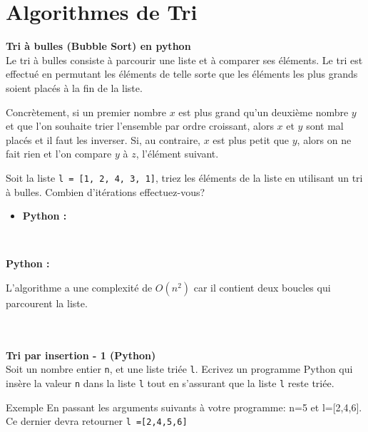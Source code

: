 \section{Algorithmes de Tri}

\begin{Exercice} [20 minutes] \textbf{Tri à bulles (Bubble Sort) en python} \\
Le tri à bulles consiste à parcourir une liste et à comparer ses éléments. Le tri est effectué en permutant les éléments de telle sorte que les éléments les plus grands soient placés à la fin de la liste. 

Concrètement, si un premier nombre $x$ est plus grand qu'un deuxième nombre $y$ et que l'on souhaite trier l'ensemble par ordre croissant, alors $x$ et $y$ sont mal placés et il faut les inverser. Si, au contraire, $x$ est plus petit que $y$, alors on ne fait rien et l'on compare $y$ à $z$, l'élément suivant.

Soit la liste \lstinline{l = [1, 2, 4, 3, 1]}, triez les éléments de la liste en utilisant un tri à bulles. Combien d'itérations effectuez-vous?

\begin{itemize}
        \item \textbf{Python :}
             
    \end{itemize}
    
    \ \\
    
    \begin{solution}
    \textbf{Python :}
    

    L'algorithme a une complexité de $O(n^2)$ car il contient deux boucles qui parcourent la liste.\\\\\\
            
\end{solution}
\end{Exercice}

\begin{Exercice}[10 minutes] \textbf{Tri par insertion - 1 (Python)}\\
    Soit un nombre entier \lstinline{n}, et une liste triée \lstinline{l}. Ecrivez un programme Python qui insère la valeur \lstinline{n} dans la liste \lstinline{l} tout en s'assurant que la liste \lstinline{l} reste triée.

    

    \begin{Exemple}{\faTerminal \quad Exemple}
        En passant les arguments suivants à votre programme: n=5 et l=[2,4,6]. Ce dernier devra retourner \lstinline{l =[2,4,5,6]}
    \end{Exemple}

    \begin{solution}
        
    \end{solution}


\end{Exercice}

